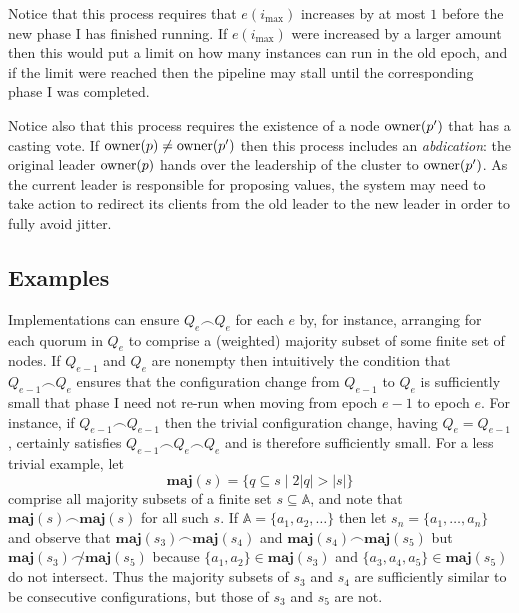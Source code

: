 \documentclass[journal]{IEEEtran}
\begin{document}
Notice that this process requires that $e(i_\mathrm{max})$ increases by at most
$1$ before the new phase I has finished running. If $e(i_\mathrm{max})$ were
increased by a larger amount then this would put a limit on how many instances
can run in the old epoch, and if the limit were reached then the pipeline may
stall until the corresponding phase I was completed.

Notice also that this process requires the existence of a node $\mathrm{owner}(p')$
that has a casting vote. If $\mathrm{owner}(p) \ne \mathrm{owner}(p')$ then this process
includes an \textit{abdication}: the original leader $\mathrm{owner}(p)$ hands over the
leadership of the cluster to $\mathrm{owner}(p')$. As the current leader is responsible
for proposing values, the system may need to take action to redirect its
clients from the old leader to the new leader in order to fully avoid jitter.

\subsection{Examples}\label{types-of-configuration-change}

\def\maj#1{\mathbf{maj}(#1)}

Implementations can ensure $Q_e \frown Q_e$ for each $e$ by, for instance,
arranging for each quorum in $Q_e$ to comprise a (weighted) majority subset of
some finite set of nodes.  If $Q_{e-1}$ and $Q_e$ are nonempty then intuitively
the condition that $Q_{e-1} \frown Q_e$ ensures that the configuration change
from $Q_{e-1}$ to $Q_e$ is sufficiently small that phase I need not re-run when
moving from epoch $e-1$ to epoch $e$.  For instance, if $Q_{e-1} \frown
Q_{e-1}$ then the trivial configuration change, having $Q_e = Q_{e-1}$,
certainly satisfies $Q_{e-1} \frown Q_e \frown Q_e$ and is therefore
sufficiently small.
%
For a less trivial example, let \[\maj{s} = \{ q \subseteq s \mid 2 |q| > |s|
\}\] comprise all majority subsets of a finite set $s \subseteq \mathbb A$, and
note that $\maj{s} \frown \maj{s}$ for all such $s$.  If $\mathbb A = \{ a_1,
a_2, \ldots \}$ then let $s_n = \{a_1, \ldots, a_n\}$ and observe that
${\maj{s_3} \frown \maj{s_4}}$ and ${\maj{s_4} \frown \maj{s_5}}$ but
${\maj{s_3} \not\frown \maj{s_5}}$ because $\{a_1, a_2\} \in \maj{s_3}$ and
$\{a_3, a_4, a_5\} \in \maj{s_5}$ do not intersect. Thus the majority subsets
of $s_3$ and $s_4$ are sufficiently similar to be consecutive configurations,
but those of $s_3$ and $s_5$ are not.
\end{document}
